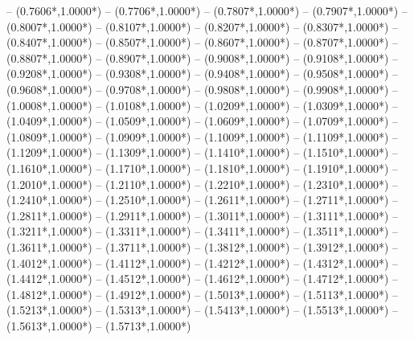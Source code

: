 {	-- ({0.7606*\dx},{1.0000*\dy})
	-- ({0.7706*\dx},{1.0000*\dy})
	-- ({0.7807*\dx},{1.0000*\dy})
	-- ({0.7907*\dx},{1.0000*\dy})
	-- ({0.8007*\dx},{1.0000*\dy})
	-- ({0.8107*\dx},{1.0000*\dy})
	-- ({0.8207*\dx},{1.0000*\dy})
	-- ({0.8307*\dx},{1.0000*\dy})
	-- ({0.8407*\dx},{1.0000*\dy})
	-- ({0.8507*\dx},{1.0000*\dy})
	-- ({0.8607*\dx},{1.0000*\dy})
	-- ({0.8707*\dx},{1.0000*\dy})
	-- ({0.8807*\dx},{1.0000*\dy})
	-- ({0.8907*\dx},{1.0000*\dy})
	-- ({0.9008*\dx},{1.0000*\dy})
	-- ({0.9108*\dx},{1.0000*\dy})
	-- ({0.9208*\dx},{1.0000*\dy})
	-- ({0.9308*\dx},{1.0000*\dy})
	-- ({0.9408*\dx},{1.0000*\dy})
	-- ({0.9508*\dx},{1.0000*\dy})
	-- ({0.9608*\dx},{1.0000*\dy})
	-- ({0.9708*\dx},{1.0000*\dy})
	-- ({0.9808*\dx},{1.0000*\dy})
	-- ({0.9908*\dx},{1.0000*\dy})
	-- ({1.0008*\dx},{1.0000*\dy})
	-- ({1.0108*\dx},{1.0000*\dy})
	-- ({1.0209*\dx},{1.0000*\dy})
	-- ({1.0309*\dx},{1.0000*\dy})
	-- ({1.0409*\dx},{1.0000*\dy})
	-- ({1.0509*\dx},{1.0000*\dy})
	-- ({1.0609*\dx},{1.0000*\dy})
	-- ({1.0709*\dx},{1.0000*\dy})
	-- ({1.0809*\dx},{1.0000*\dy})
	-- ({1.0909*\dx},{1.0000*\dy})
	-- ({1.1009*\dx},{1.0000*\dy})
	-- ({1.1109*\dx},{1.0000*\dy})
	-- ({1.1209*\dx},{1.0000*\dy})
	-- ({1.1309*\dx},{1.0000*\dy})
	-- ({1.1410*\dx},{1.0000*\dy})
	-- ({1.1510*\dx},{1.0000*\dy})
	-- ({1.1610*\dx},{1.0000*\dy})
	-- ({1.1710*\dx},{1.0000*\dy})
	-- ({1.1810*\dx},{1.0000*\dy})
	-- ({1.1910*\dx},{1.0000*\dy})
	-- ({1.2010*\dx},{1.0000*\dy})
	-- ({1.2110*\dx},{1.0000*\dy})
	-- ({1.2210*\dx},{1.0000*\dy})
	-- ({1.2310*\dx},{1.0000*\dy})
	-- ({1.2410*\dx},{1.0000*\dy})
	-- ({1.2510*\dx},{1.0000*\dy})
	-- ({1.2611*\dx},{1.0000*\dy})
	-- ({1.2711*\dx},{1.0000*\dy})
	-- ({1.2811*\dx},{1.0000*\dy})
	-- ({1.2911*\dx},{1.0000*\dy})
	-- ({1.3011*\dx},{1.0000*\dy})
	-- ({1.3111*\dx},{1.0000*\dy})
	-- ({1.3211*\dx},{1.0000*\dy})
	-- ({1.3311*\dx},{1.0000*\dy})
	-- ({1.3411*\dx},{1.0000*\dy})
	-- ({1.3511*\dx},{1.0000*\dy})
	-- ({1.3611*\dx},{1.0000*\dy})
	-- ({1.3711*\dx},{1.0000*\dy})
	-- ({1.3812*\dx},{1.0000*\dy})
	-- ({1.3912*\dx},{1.0000*\dy})
	-- ({1.4012*\dx},{1.0000*\dy})
	-- ({1.4112*\dx},{1.0000*\dy})
	-- ({1.4212*\dx},{1.0000*\dy})
	-- ({1.4312*\dx},{1.0000*\dy})
	-- ({1.4412*\dx},{1.0000*\dy})
	-- ({1.4512*\dx},{1.0000*\dy})
	-- ({1.4612*\dx},{1.0000*\dy})
	-- ({1.4712*\dx},{1.0000*\dy})
	-- ({1.4812*\dx},{1.0000*\dy})
	-- ({1.4912*\dx},{1.0000*\dy})
	-- ({1.5013*\dx},{1.0000*\dy})
	-- ({1.5113*\dx},{1.0000*\dy})
	-- ({1.5213*\dx},{1.0000*\dy})
	-- ({1.5313*\dx},{1.0000*\dy})
	-- ({1.5413*\dx},{1.0000*\dy})
	-- ({1.5513*\dx},{1.0000*\dy})
	-- ({1.5613*\dx},{1.0000*\dy})
	-- ({1.5713*\dx},{1.0000*\dy})
}
